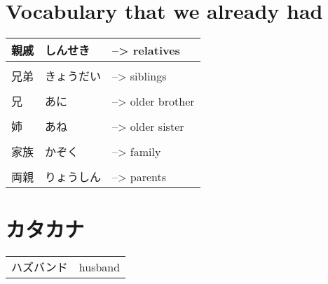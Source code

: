 \documentclass{article}
\begin{document}
\part*{Vocabulary that we already had}
\begin{tabular}{ l | l l }
親戚&しんせき&--> relatives \\ \hline\\[-1em]
兄弟&きょうだい&--> siblings \\ \hline\\[-1em]
兄&あに&--> older brother \\ \hline\\[-1em]
姉&あね&--> older sister \\ \hline\\[-1em]
家族&かぞく&--> family \\ \hline\\[-1em]
両親&りょうしん&--> parents
\end{tabular}

\part*{カタカナ}
\begin{tabular}{ l | l }
ハズバンド&husband
\end{tabular}
\end{document}
